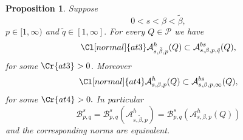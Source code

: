 \documentclass{amsart}
\newtheorem{proposition}[theorem]{Proposition}
\theoremstyle{definition}
\newcommand{\Cll}[2][normal]{\Cl[#1]{#2}}
\newcommand{\Crr}[1]{\Cr{#1}}
\begin{document}
\begin{proposition} \label{hold} Suppose
$$0< s  < \beta < \tilde{\beta},$$
$p\in [1,\infty)$ and  $\tilde{q}\in [1,\infty].$  For every $Q\in \mathcal{P}$ we have 
\begin{equation}\label{final1} \Cll{at3} \mathcal{A}^{h}_{s,\tilde{\beta},p}(Q)\subset \mathcal{A}^{bs}_{s,\beta,p,\tilde{q}}(Q),\end{equation}  for some $\Crr{at3} > 0$. Moreover
\begin{equation}\label{final2} \Cll{at4} \mathcal{A}^{h}_{s,\beta,p}(Q)\subset \mathcal{A}^{bs}_{s,\beta,p,\infty}(Q),\end{equation}  for some $\Crr{at4} > 0.$ In particular
\begin{equation}\label{inclusion1}\mathcal{B}^s_{p,q}=\mathcal{B}^s_{p,q}(\mathcal{A}^{h}_{s,\tilde{\beta},p})=\mathcal{B}^s_{p,q}(\mathcal{A}^{h}_{s,\beta,p}(Q))\end{equation}
and the corresponding norms are equivalent.
\end{proposition} 
\end{document}
